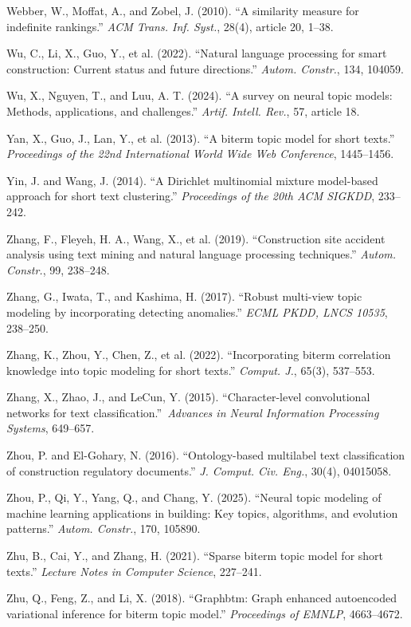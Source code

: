 \documentclass[Journal,letterpaper,NoLists]{ascelike-new}
\begin{document}
Webber, W., Moffat, A., and Zobel, J. (2010). ``A similarity measure for indefinite rankings.'' \emph{ACM Trans. Inf. Syst.}, 28(4), article 20, 1--38.

Wu, C., Li, X., Guo, Y., et al. (2022). ``Natural language processing for smart construction: Current status and future directions.'' \emph{Autom. Constr.}, 134, 104059.

Wu, X., Nguyen, T., and Luu, A. T. (2024). ``A survey on neural topic models: Methods, applications, and challenges.'' \emph{Artif. Intell. Rev.}, 57, article 18.

Yan, X., Guo, J., Lan, Y., et al. (2013). ``A biterm topic model for short texts.'' \emph{Proceedings of the 22nd International World Wide Web Conference}, 1445--1456.

Yin, J. and Wang, J. (2014). ``A {Dirichlet} multinomial mixture model-based approach for short text clustering.'' \emph{Proceedings of the 20th ACM SIGKDD}, 233--242.

Zhang, F., Fleyeh, H. A., Wang, X., et al. (2019). ``Construction site accident analysis using text mining and natural language processing techniques.'' \emph{Autom. Constr.}, 99, 238--248.

Zhang, G., Iwata, T., and Kashima, H. (2017). ``Robust multi-view topic modeling by incorporating detecting anomalies.'' \emph{ECML PKDD, LNCS 10535}, 238--250.

Zhang, K., Zhou, Y., Chen, Z., et al. (2022). ``Incorporating biterm correlation knowledge into topic modeling for short texts.'' \emph{Comput. J.}, 65(3), 537--553.

Zhang, X., Zhao, J., and LeCun, Y. (2015). ``Character-level convolutional networks for text classification.''\ \emph{Advances in Neural Information Processing Systems}, 649--657.

Zhou, P. and El-Gohary, N. (2016). ``Ontology-based multilabel text classification of construction regulatory documents.'' \emph{J. Comput. Civ. Eng.}, 30(4), 04015058.

Zhou, P., Qi, Y., Yang, Q., and Chang, Y. (2025). ``Neural topic modeling of machine learning applications in building: Key topics, algorithms, and evolution patterns.'' \emph{Autom. Constr.}, 170, 105890.

Zhu, B., Cai, Y., and Zhang, H. (2021). ``Sparse biterm topic model for short texts.'' \emph{Lecture Notes in Computer Science}, 227--241.

Zhu, Q., Feng, Z., and Li, X. (2018). ``Graphbtm: Graph enhanced autoencoded variational inference for biterm topic model.'' \emph{Proceedings of EMNLP}, 4663--4672.
\end{document}
